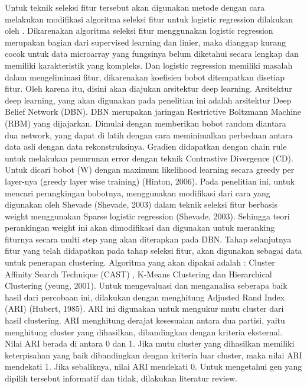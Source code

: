 Untuk teknik seleksi fitur tersebut akan digunakan metode dengan cara melakukan modifikasi algoritma seleksi fitur untuk logistic regression dilakukan oleh \cite{shevade2003simple}. 
Dikarenakan algoritma seleksi fitur menggunakan logistic regression merupakan bagian dari supervised learning dan linier, maka dianggap kurang cocok untuk data microarray yang fungsinya belum diketahui secara lengkap dan memiliki karakteristik yang kompleks. Dan logistic regression memiliki masalah dalam  mengeliminasi fitur, dikarenakan koefisien bobot ditempatkan disetiap fitur. Oleh karena itu, disini akan diajukan arsitektur deep learning.
Arsitektur deep learning, yang akan digunakan pada penelitian ini adalah arsitektur Deep Belief Network (DBN). DBN merupakan jaringan Restrictive Boltzmann Machine (RBM) yang dijajarkan. Dimulai dengan memberikan bobot random diantara dua network, yang dapat di latih dengan cara meminimalkan perbedaan antara data asli dengan data rekonstruksinya. Gradien didapatkan dengan chain rule untuk melakukan penurunan error dengan teknik Contrastive Divergence (CD). Untuk dicari bobot (W) dengan maximum likelihood learning  secara greedy per layer-nya (greedy layer wise training) (Hinton, 2006). Pada penelitian ini, untuk mencari perangkingan bobotnya, menggunakan modifikasi dari cara yang digunakan oleh Shevade (Shevade, 2003) dalam teknik seleksi fitur berbasis weight menggunakan Sparse logistic regression (Shevade, 2003). Sehingga teori perankingan weight ini akan dimodifikasi dan digunakan untuk  meranking fiturnya secara multi step yang akan diterapkan pada DBN.
Tahap selanjutnya fitur yang telah didapatkan pada tahap seleksi fitur, akan digunakan sebagai data untuk penerapan clustering. Algoritma yang akan dipakai adalah : Cluster Affinity Search Technique (CAST) , K-Means Clustering dan Hierarchical Clustering (yeung, 2001). Untuk mengevaluasi dan menganalisa seberapa baik hasil dari percobaan ini, dilakukan dengan menghitung Adjusted Rand Index (ARI) (Hubert, 1985). ARI ini digunakan untuk mengukur mutu cluster dari hasil clustering. ARI menghitung derajat kesesuaian antara dua partisi, yaitu menghitung cluster yang dihasilkan, dibandingkan dengan kriteria eksternal. Nilai ARI berada di antara 0 dan 1. Jika mutu cluster yang dihasilkan memiliki keterpisahan yang baik dibandingkan dengan kriteria luar cluster, maka nilai ARI mendekati 1. Jika sebaliknya, nilai ARI mendekati 0. Untuk mengetahui gen yang dipilih tersebut informatif dan tidak, dilakukan literatur review.






